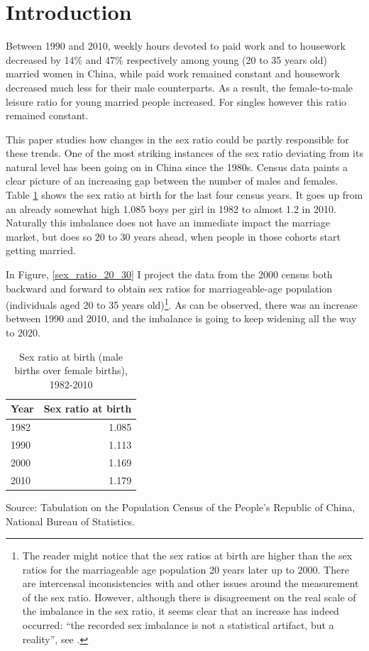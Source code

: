 \documentclass[12pt]{article}
\newcommand{\source}[1]{\caption*{Source: {#1}} }
\begin{document}


\section{Introduction} \label{sec:introduction}

Between 1990 and 2010, weekly hours devoted to paid work and to housework decreased by 14\% and 47\% respectively among young (20 to 35 years old) married women in China, while paid work remained constant and housework decreased much less for their male counterparts. As a result, the female-to-male leisure ratio for young married people increased. For singles however this ratio remained constant. 

This paper studies how changes in the sex ratio could be partly responsible for these trends. One of the most striking instances of the sex ratio deviating from its natural level has been going on in China since the 1980s. Census data paints a clear picture of an increasing gap between the number of males and females. Table \ref{srb_census} shows the sex ratio at birth for the last four census years. It goes up from an already somewhat high 1.085 boys per girl in 1982 to almost 1.2 in 2010. Naturally this imbalance does not have an immediate impact the marriage market, but does so 20 to 30 years ahead, when people in those cohorts start getting married. 

In Figure, \ref{sex_ratio_20_30} I project the data from the 2000 census both backward and forward to obtain sex ratios for marriageable-age population (individuals aged 20 to 35 years old)\footnote{The reader might notice that the sex ratios at birth are higher than the sex ratios for the marriageable age population 20 years later up to 2000. 
There are intercensal inconsistencies with and other issues around the measurement of the sex ratio. However, although there is disagreement on the real scale of the imbalance in the sex ratio, it seems clear that an increase has indeed occurred: ``the recorded sex imbalance is not a statistical artifact, but a reality'', see \citealp{cai13}.}. As can be observed, there was an increase between 1990 and 2010, and the imbalance is going to keep widening all the way to 2020.    

\begin{table}[htbp]
	\centering
	\caption{Sex ratio at birth (male births over female births), 1982-2010}
	\begin{tabular}{lr}
		\toprule
		Year & \multicolumn{1}{l}{Sex ratio at birth} \\
		\midrule
		1982 & 1.085 \\
		1990 & 1.113 \\
		2000 & 1.169 \\
		2010 & 1.179 \\
		\bottomrule
		\bottomrule
	\end{tabular}
	\label{srb_census}
	\source{Tabulation on the Population Census of the People's Republic of China, National Bureau of Statistics.}
\end{table}
\end{document}
